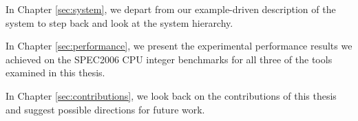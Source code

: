 In Chapter \ref{sec:system}, we depart from our example-driven description of
the system to step back and look at the system hierarchy.

In Chapter \ref{sec:performance}, we present the experimental performance
results we achieved on the SPEC2006 CPU integer benchmarks\cite{spec_cpu_2k6}
for all three of the tools examined in this thesis.

In Chapter \ref{sec:contributions}, we look back on the contributions of this
thesis and suggest possible directions for future work.
